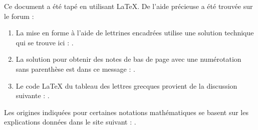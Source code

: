 
Ce document a été tapé en utilisant \LaTeX{}. De l'aide précieuse a été trouvée sur le forum  :

\begin{enumerate}
	\item La mise en forme à l'aide de lettrines encadrées utilise une solution technique qui se trouve ici : .

	\item La solution pour obtenir des notes de bas de page avec une numérotation sans parenthèse est dans ce message : .

	\item Le code \LaTeX{} du tableau des lettres grecques provient de la discussion suivante : .

\end{enumerate}

\noindent Les origines indiquées pour certaines notations mathématiques se basent sur les explications données dans le site suivant : .